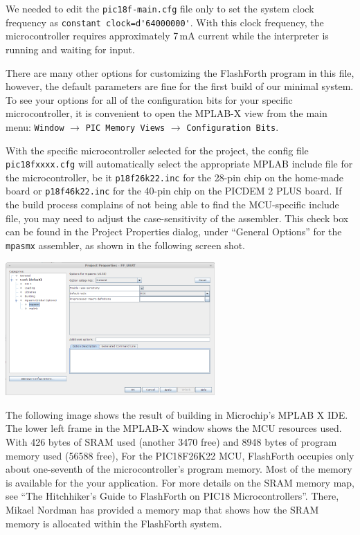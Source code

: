 \documentclass[12pt,a4paper]{article}
\begin{document}
\medskip\noindent
We needed to edit the \verb!pic18f-main.cfg! file only to set the system clock frequency
as \verb!constant clock=d'64000000'!.
With this clock frequency, the microcontroller requires approximately 7\,mA current while
the interpreter is running and waiting for input.

\medskip\noindent
There are many other options for customizing the FlashForth program in this file,
however, the default parameters are fine for the first build of our minimal system.
To see your options for all of the configuration bits for your specific microcontroller, 
it is convenient to open the MPLAB-X view from the main menu:
\verb!Window! $\rightarrow$ \verb!PIC Memory Views! $\rightarrow$ \verb!Configuration Bits!.


\medskip\noindent
With the specific microcontroller selected for the project, the config file
\verb!pic18fxxxx.cfg! will automatically select the appropriate MPLAB include file for 
the microcontroller, be it \verb!p18f26k22.inc! for the 28-pin chip on the home-made board
or \verb!p18f46k22.inc! for the 40-pin chip on the PICDEM 2 PLUS board.
If the build process complains of not being able to find the MCU-specific include file,
you may need to adjust the case-sensitivity of the assembler.
This check box can be found in the Project Properties dialog, 
under ``General Options'' for the \verb!mpasmx! assembler, as shown in the following screen shot. 

\bigskip
\noindent
\begin{center}
\includegraphics[width=0.6\textwidth]{../figs/MPLAB-X-mpasm-case-sensitivity.png}
\end{center}

\medskip\noindent
The following image shows the result of building in Microchip's MPLAB X IDE.
The lower left frame in the MPLAB-X window shows the MCU resources used.
With 426 bytes of SRAM used (another 3470 free) and 
8948 bytes of program memory used (56588 free),
For the PIC18F26K22 MCU, FlashForth occupies only about one-seventh of 
the microcontroller's program memory.
Most of the memory is available for the your application.
For more details on the SRAM memory map, 
see ``The Hitchhiker's Guide to FlashForth on PIC18 Microcontrollers''.
There, Mikael Nordman has provided a memory map that shows how
the SRAM memory is allocated within the FlashForth system. 
\end{document}
